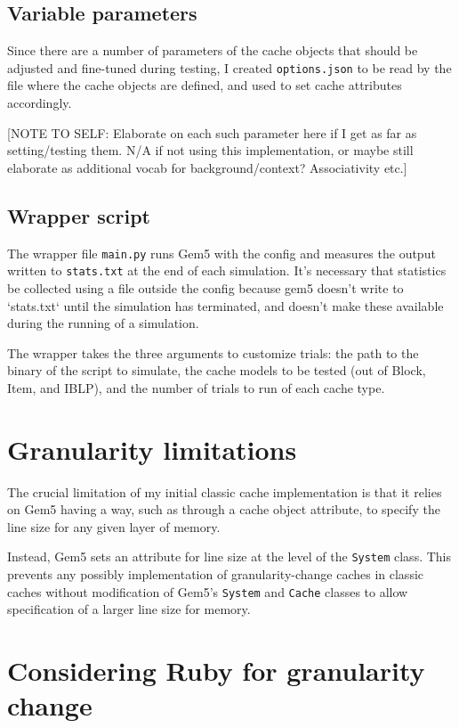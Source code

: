 \documentclass[12pt,twoside]{reedthesis}
\begin{document}
	\subsection*{Variable parameters}

	Since there are a number of parameters of the cache objects that should be adjusted and fine-tuned during testing, I created \verb`options.json` to be read by the file where the cache objects are defined, and used to set cache attributes accordingly.

	[NOTE TO SELF: Elaborate on each such parameter here if I get as far as setting/testing them. N/A if not using this implementation, or maybe still elaborate as additional vocab for background/context? Associativity etc.]


	\subsection*{Wrapper script}

	The wrapper file \verb`main.py` runs Gem5 with the config and measures the output written to \verb`stats.txt` at the end of each simulation. It's necessary that statistics be collected using a file outside the config because gem5 doesn't write to `stats.txt` until the simulation has terminated, and doesn't make these available during the running of a simulation.

	The wrapper takes the three arguments to customize trials: the path to the binary of the script to simulate, the cache models to be tested (out of Block, Item, and IBLP), and the number of trials to run of each cache type.

\section{Granularity limitations}

	The crucial limitation of my initial classic cache implementation is that it relies on Gem5 having a way, such as through a cache object attribute, to specify the line size for any given layer of memory.

	Instead, Gem5 sets an attribute for line size at the level of the \verb`System` class. This prevents any possibly implementation of granularity-change caches in classic caches without modification of Gem5's \verb`System` and \verb`Cache` classes to allow specification of a larger line size for memory.


\section{Considering Ruby for granularity change}
\end{document}
